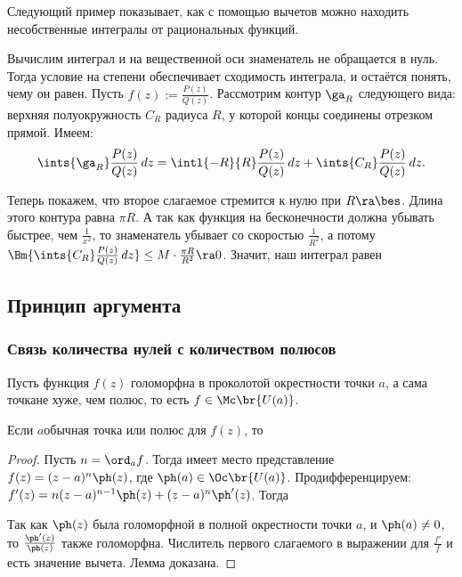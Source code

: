 \documentclass[a4paper]{article}
\def\mcomp#1{\mskip-10mu#1\mskip-10mu}
\begin{document}
Следующий пример показывает, как с помощью вычетов можно находить несобственные интегралы от рациональных функций.

\begin{ex}
Вычислим интеграл
и на вещественной оси знаменатель не обращается в нуль. Тогда условие на степени обеспечивает сходимость интеграла,
и остаётся понять, чему он равен. Пусть $f(z) := \frac{P(z)}{Q(z)}$. Рассмотрим контур $\ga_R$ следующего вида:
верхняя полуокружность $C_R$ радиуса $R$, у которой концы соединены отрезком прямой.  Имеем:
$$\ints{\ga_R}\frac{P(z)}{Q(z)}\,dz= \intl{-R}{R}\frac{P(z)}{Q(z)}\,dz+ \ints{C_R}\frac{P(z)}{Q(z)}\,dz.$$


Теперь покажем, что второе слагаемое стремится к нулю при $R \ra \bes$. Длина этого контура равна $\pi R$. А так как
функция на бесконечности должна убывать быстрее, чем $\frac{1}{x^2}$, то знаменатель убывает со скоростью $\frac{1}{R^2}$,
а потому $\Bm{\ints{C_R}\frac{P(z)}{Q(z)}\,dz} \le M \cdot \frac{\pi R}{R^2} \ra 0$.
Значит, наш интеграл равен
\eqn{I = 2\pi i \mcomp{\sums{\Img a_i > 0}} \res_{a_i} f.}
\end{ex}

\subsection{Принцип аргумента}

\subsubsection{Связь количества нулей с количеством полюсов}

Пусть функция $f(z)$ голоморфна в проколотой окрестности точки $a$, а сама точка\т не хуже, чем полюс, то есть $f \in \Mc\br{U(a)}$.

\begin{lemma}
Если $a$\т обычная точка или полюс для $f(z)$, то
\end{lemma}
\begin{proof}
Пусть $n = \ord_a f$. Тогда имеет место представление $f(z) = (z-a)^n \ph(z)$, где $\ph(a) \in \Oc\br{U(a)}$.
Продифференцируем: $f'(z)=n(z-a)^{n-1}\ph(z)+(z-a)^{n}\ph'(z)$. Тогда

Так как $\ph(z)$ была голоморфной в полной окрестности точки $a$, и $\ph(a) \neq 0$, то $\frac{\ph'(z)}{\ph(z)}$
также голоморфна. Числитель первого слагаемого в выражении для $\frac{f'}{f}$ и есть значение вычета. Лемма доказана.
\end{proof}
\end{document}
